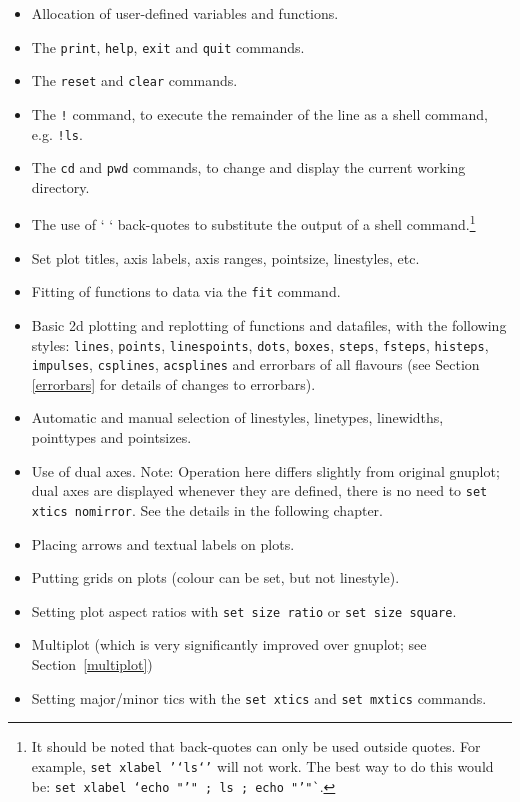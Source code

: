 \documentclass[a4paper,onecolumn,11pt]{book}
\begin{document}
\begin{itemize}
\item Allocation of user-defined variables and functions.
\item The \texttt{print}, \texttt{help}, \texttt{exit} and \texttt{quit} commands.
\item The \texttt{reset} and \texttt{clear} commands.
\item The \texttt{!} command, to execute the remainder of the line as a shell command, e.g. \texttt{!ls}.
\item The \texttt{cd} and \texttt{pwd} commands, to change and display the current working directory.
\item The use of ` ` back-quotes to substitute the output of a shell command.\footnote{It should be noted that back-quotes can only be used outside quotes. For example, \texttt{set xlabel '`ls`'} will not work. The best way to do this would be: \texttt{set xlabel `echo "'" ; ls ; echo "'"`}.}
\item Set plot titles, axis labels, axis ranges, pointsize, linestyles, etc.
\item Fitting of functions to data via the \texttt{fit} command.
\item Basic 2d plotting and replotting of functions and datafiles, with the following styles: \texttt{lines}, \texttt{points}, \texttt{linespoints}, \texttt{dots}, \texttt{boxes}, \texttt{steps}, \texttt{fsteps}, \texttt{histeps}, \texttt{impulses}, \texttt{csplines}, \texttt{acsplines} and errorbars of all flavours (see Section \ref{errorbars} for details of changes to errorbars).
\item Automatic and manual selection of linestyles, linetypes, linewidths, pointtypes and pointsizes.
\item Use of dual axes. Note: Operation here differs slightly from original gnuplot; dual axes are displayed whenever they are defined, there is no need to \texttt{set xtics nomirror}. See the details in the following chapter.
\item Placing arrows and textual labels on plots.
\item Putting grids on plots (colour can be set, but not linestyle).
\item Setting plot aspect ratios with \texttt{set size ratio} or \texttt{set size square}.
\item Multiplot (which is very significantly improved over gnuplot; see Section~\ref{multiplot})
\item Setting major/minor tics with the \texttt{set xtics} and \texttt{set mxtics} commands.
\end{itemize}
\end{document}
